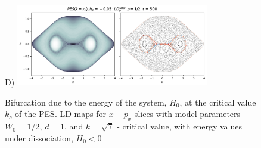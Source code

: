 \documentclass[10pt,aps,onecolumn,superscriptaddress]{revtex4-2}
\begin{document}
\begin{figure}
    D) \includegraphics[width=0.75\textwidth]{notebooks/bifurcation/k_critical/LD_total_y-py_tau_500_k_kc_E_-0.05_PP.png}
    \caption{Bifurcation due to the energy of the system, $H_0$, at the critical value $k_c$ of the PES. LD maps for $x-p_x$ slices with model parameters $W_0 = 1/2$, $d = 1$, and $k = \sqrt{7}$ - critical value, with energy values under dissociation, $H_0 < 0$}
\end{figure}

%
%
\end{document}
